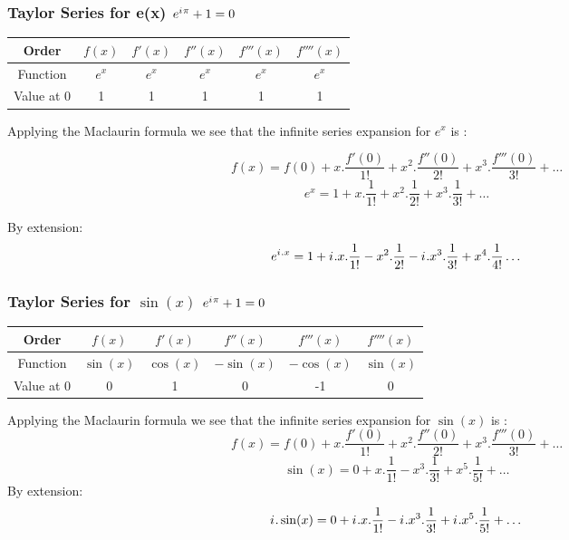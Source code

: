 \documentclass[10pt]{beamer}
\newcommand{\iu}{{i\mkern1mu}}
\begin{document}
\begin{frame}
	\frametitle{Taylor Series for e(x) \hspace{25pt} \textcolor{pink}{\Huge\(e^{\iu \pi} +1 = 0\)}}
	\begin{center}
		\begin{tabular}{|c|c|c|c|c|c|}
			\hline
			Order &$f(x)$ & $f'(x)$ & $f''(x)$ & $f'''(x)$ & $f''''(x)$ \\
			\hline
			Function & $e^x$  & $e^x$   & $e^x$    & $e^x$     & $e^x$      \\
			\hline
			Value at 0 & 1      & 1       & 1        & 1         & 1          \\
			\hline
		\end{tabular}
	\end{center}
	\vspace{20pt}
	Applying the Maclaurin formula we see that the infinite series expansion for $e^x$ is :

	{\large $$f(x) = f(0)+x.\dfrac{f'(0)}{1!}+ x^2.\dfrac{f''(0)}{2!} +x^3.\dfrac{f'''(0)}{3!} + \dots$$
	\large $$e^x = 1+x.\dfrac{1}{1!}+ x^2.\dfrac{1}{2!} +x^3.\dfrac{1}{3!} + \dots$$}

	By extension:
	{\large $$e^{{\iu}.x} = 1+\iu.x.\dfrac{1}{1!}- x^2.\dfrac{1}{2!} -\iu.x^3.\dfrac{1}{3!} + x^4.\dfrac{1}{4!} \dots$$}
\end{frame}

\begin{frame}
	\frametitle{Taylor Series for $\sin(x)$ \hspace{25pt} \textcolor{pink}{\Huge\(e^{\iu \pi} +1 = 0\)}}
	\begin{center}
		\begin{tabular}{|c|c|c|c|c|c|}
			\hline
			Order & \(f(x)\)    & \(f'(x)\)   & \(f''(x)\)   & \(f'''(x)\)  & \(f''''(x)\) \\
			\hline
			Function & \(\sin(x)\) & \(\cos(x)\) & \(-\sin(x)\) & \(-\cos(x)\) & \(\sin(x)\)  \\
			\hline
			Value at 0 & 0           & 1           & 0            & -1           & 0            \\
			\hline
		\end{tabular}
	\end{center}
	\vspace{20pt}
	Applying the Maclaurin formula we see that the infinite series expansion for $\sin(x)$ is :
	{\large $$f(x) = f(0)+x.\dfrac{f'(0)}{1!}+ x^2.\dfrac{f''(0)}{2!} +x^3.\dfrac{f'''(0)}{3!} + \dots$$
	\large $$\sin(x) = 0+x.\dfrac{1}{1!} -x^3.\dfrac{1}{3!} + x^5.\dfrac{1}{5!} +\dots$$}	
	By extension: 
	{\large $$\iu.\sin(x) = 0+\iu.x.\dfrac{1}{1!} -\iu.x^3.\dfrac{1}{3!} + \iu.x^5.\dfrac{1}{5!} +\dots$$}

\end{frame}
\end{document}
